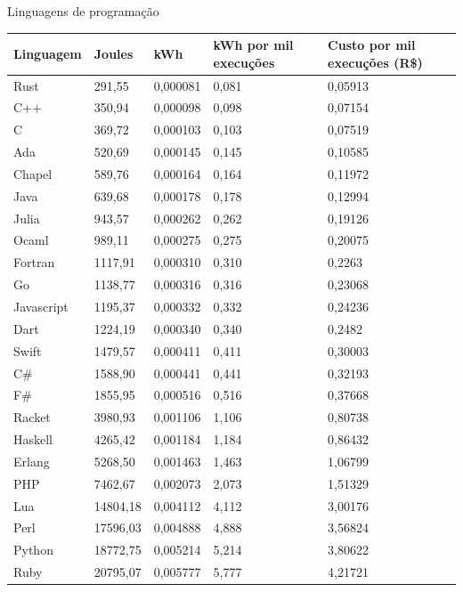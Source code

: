 \begin{frame}{Linguagens de programação}
    \centering
    \begin{table}[!hp]
      \centering
      \fontsize{6}{7}\selectfont
      \begin{tabular}{l|l|l|l|l}
        \toprule
        \textbf{Linguagem} & \textbf{Joules} & \textbf{kWh} & \textbf{kWh por mil execuções} & \textbf{Custo por mil execuções (R\$)} \\
        \toprule
        Rust & 291,55 & 0,000081 & 0,081 & 0,05913 \\
        \hline
        C++ & 350,94 & 0,000098 & 0,098 & 0,07154 \\
        \hline
        C & 369,72 & 0,000103 & 0,103 & 0,07519 \\
        \hline
        Ada & 520,69 & 0,000145 & 0,145 & 0,10585 \\
        \hline
        Chapel & 589,76 & 0,000164 & 0,164 & 0,11972 \\
        \hline
        Java & 639,68 & 0,000178 & 0,178 & 0,12994 \\
        \hline
        Julia &  943,57 & 0,000262 & 0,262 & 0,19126 \\
        \hline
        Ocaml & 989,11 & 0,000275 & 0,275 & 0,20075 \\
        \hline
        Fortran & 1117,91 & 0,000310 & 0,310 & 0,2263 \\
        \hline
        Go & 1138,77 & 0,000316 & 0,316 & 0,23068 \\
        \hline
        Javascript & 1195,37 & 0,000332 & 0,332 & 0,24236 \\
        \hline
        Dart & 1224,19 & 0,000340 & 0,340 & 0,2482 \\
        \hline
        Swift & 1479,57 & 0,000411 & 0,411 & 0,30003 \\
        \hline
        C\# & 1588,90 & 0,000441 & 0,441 & 0,32193 \\
        \hline
        F\# & 1855,95 & 0,000516 & 0,516 & 0,37668 \\
        \hline
        Racket & 3980,93 & 0,001106 & 1,106 & 0,80738 \\
        \hline
        Haskell & 4265,42 & 0,001184 & 1,184 & 0,86432 \\
        \hline
        Erlang & 5268,50 & 0,001463 & 1,463 & 1,06799 \\
        \hline
        PHP & 7462,67 & 0,002073 & 2,073 & 1,51329 \\
        \hline
        Lua & 14804,18 & 0,004112 & 4,112 & 3,00176 \\
        \hline
        Perl & 17596,03 & 0,004888 & 4,888 & 3,56824 \\
        \hline
        Python & 18772,75 & 0,005214 & 5,214 & 3,80622 \\
        \hline
        Ruby & 20795,07 & 0,005777 & 5,777 & 4,21721 \\
        \bottomrule
      \end{tabular}
    \end{table}
\end{frame}
